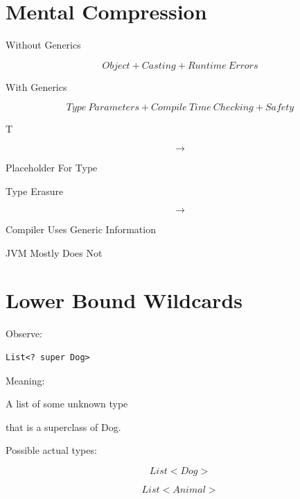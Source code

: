\documentclass[11pt,a4paper]{book}
\begin{document}

\section{Mental Compression}

Without Generics

\[
Object
+
Casting
+
Runtime\ Errors
\]


With Generics

\[
Type\ Parameters
+
Compile\ Time\ Checking
+
Safety
\]


T

\[
\rightarrow
\]

Placeholder For Type


Type Erasure

\[
\rightarrow
\]

Compiler Uses Generic Information

JVM Mostly Does Not
\section{Lower Bound Wildcards}

Observe:

\begin{verbatim} 
List<? super Dog>
\end{verbatim}


Meaning:


A list of some unknown type

that is a superclass of Dog.


Possible actual types:

\[
List<Dog>
\]


\[
List<Animal>
\]
\end{document}
